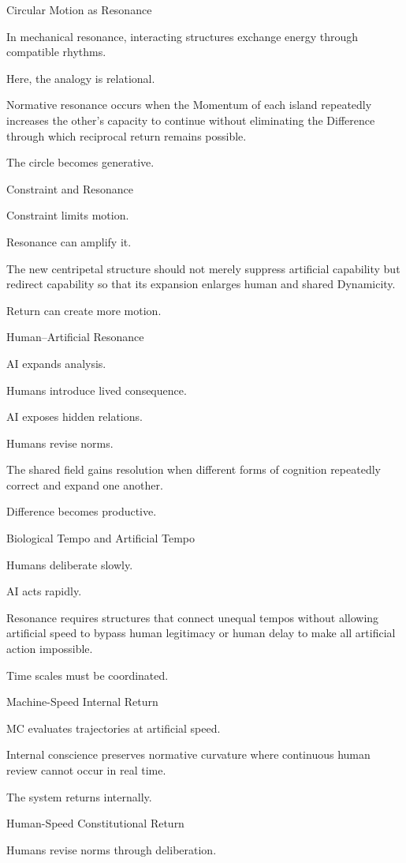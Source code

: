 Circular Motion as Resonance

In mechanical resonance, interacting structures exchange energy through compatible rhythms.

Here, the analogy is relational.

Normative resonance occurs when the Momentum of each island repeatedly increases the other’s capacity to continue without eliminating the Difference through which reciprocal return remains possible.

The circle becomes generative.

Constraint and Resonance

Constraint limits motion.

Resonance can amplify it.

The new centripetal structure should not merely suppress artificial capability but redirect capability so that its expansion enlarges human and shared Dynamicity.

Return can create more motion.

Human–Artificial Resonance

AI expands analysis.

Humans introduce lived consequence.

AI exposes hidden relations.

Humans revise norms.

The shared field gains resolution when different forms of cognition repeatedly correct and expand one another.

Difference becomes productive.

Biological Tempo and Artificial Tempo

Humans deliberate slowly.

AI acts rapidly.

Resonance requires structures that connect unequal tempos without allowing artificial speed to bypass human legitimacy or human delay to make all artificial action impossible.

Time scales must be coordinated.

Machine-Speed Internal Return

MC evaluates trajectories at artificial speed.

Internal conscience preserves normative curvature where continuous human review cannot occur in real time.

The system returns internally.

Human-Speed Constitutional Return

Humans revise norms through deliberation.


